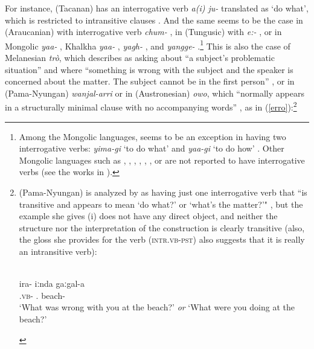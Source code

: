 \documentclass[output=paper]{langsci/langscibook}
\begin{document}
For instance,  (Tacanan) has an interrogative verb \emph{a(i) ju-}
translated as `do what', which is restricted to intransitive clauses
\citep{guillaume2008}. And the same seems to be the case in 
(Araucanian) with interrogative verb \emph{chum-}
\citep{deaugusta1903,smeets2007}, in  (Tungusic) with \emph{e:-}
\citep{Nedjalkov1997}, or in Mongolic  \emph{yaa-} \citep{skribnik2003},
Khalkha \emph{yaa-} \citep{svantesson2003},  \emph{yagh-}
\citep{blasing2003}, and  \emph{yangge-}
\citep{hugjiltu2003}.\footnote{Among the Mongolic languages,  seems
    to be an exception in having two interrogative verbs: \emph{yima-gi} `to do
    what' and \emph{yaa-gi} `to do how' \citep{nugteren2003}. Other Mongolic
    languages such as , , , , , , or
     are not reported to have interrogative verbs (see the works in
\citealt{janhunen2003}).} This is also the case of Melanesian 
\emph{tr\`o}, which \citet[229]{osumi1995} describes as asking about ``a
subject's problematic situation'' and where ``something is wrong with the
subject and the speaker is concerned about the matter.  The subject cannot be
in the first person'' \citep[233]{osumi1995}, or in  (Pama-Nyungan)
\emph{wanjal-arri} \citep{jones2011} or in  (Austronesian)
\emph{owo}, which ``normally appears in a structurally minimal clause with no
accompanying words'' \citep[238]{crowley1998}, as in
(\ref{erro}):\footnote{ (Pama-Nyungan) is analyzed by
    \citet{eades1979} as having just one interrogative verb that ``is
    transitive and appears to mean `do what?' or `what's the matter?'"
    \citep[302--303]{eades1979}, but the example she gives (i) does
    not have any direct object, and neither the structure nor the
    interpretation of the construction is clearly transitive (also, the gloss
    she provides for the verb (\textsc{intr.vb-pst}) also suggests that it is
    really an intransitive verb):

\begin{exe}
     \label{gumb} \\
    \gll \textbardotlessj ira-\ng{} {\ng iːnda} gaːgal-a\\
    \Intr.\textsc{vb}-\Pst{} \Ssg{}.\Aa{} beach-\Loc{}\\
\glt `What was wrong with you at the beach?' \textit{or} `What were you doing at the beach?'
\end{exe}
}
\end{document}
